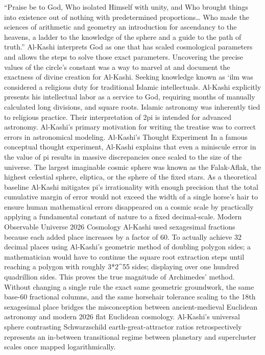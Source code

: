 {“Praise be to God, Who isolated Himself with unity, and Who brought things into existence out of nothing with predetermined proportions… Who made the sciences of arithmetic and geometry an introduction for ascendancy to the heavens, a ladder to the knowledge of the sphere and a guide to the path of truth.”
Al-Kashi interprets God as one that has scaled cosmological parameters and allows the steps to solve those exact parameters. Uncovering the precise values of the circle’s constant was a way to marvel at and document the exactness of divine creation for Al-Kashi. Seeking knowledge known as ‘ilm was considered a religious duty for traditional Islamic intellectuals. Al-Kashi explicitly presents his intellectual labor as a service to God, requiring months of manually calculated long divisions, and square roots. Islamic astronomy was inherently tied to religious practice. Their interpretation of 2pi is intended for advanced astronomy. Al-Kashi’s primary motivation for writing the treatise was to correct errors in astronomical modeling. 
Al-Kashi’s Thought Experiment
In a famous conceptual thought experiment, Al-Kashi explains that even a miniscule error in the value of pi results in massive discrepancies once scaled to the size of the universe. The largest imaginable cosmic sphere was known as the Falak-Aflak, the highest celestial sphere, eliptica, or the sphere of the fixed stars. As a theoretical baseline Al-Kashi mitigates pi’s irrationality with enough precision that the total cumulative margin of error would not exceed the width of a single horse’s hair to ensure human mathematical errors disappeared on a cosmic scale by practically applying a fundamental constant of nature to a fixed decimal-scale.
Modern Observable Universe 2026 Cosmology
Al-Kashi used sexagesimal fractions because each added place increases by a factor of 60. To actually achieve 32 decimal places using Al-Kashi’s geometric method of doubling polygon sides; a mathematician would have to continue the square root extraction steps until reaching a polygon with roughly 3*2^55 sides; displaying over one hundred quadrillion sides. This proves the true magnitude of Archimedes’ method. Without changing a single rule the exact same geometric groundwork, the same base-60 fractional columns, and the same horsehair tolerance scaling to the 18th sexagesimal place bridges the misconception between ancient-medieval Euclidean astronomy and modern 2026 flat Euclidean cosmology. Al-Kashi’s universal sphere contrasting Schwarzschild earth-great-attractor ratios retrospectively represents an in-between transitional regime between planetary and supercluster scales once mapped logarithmically. 
}
